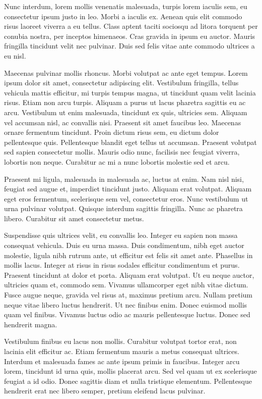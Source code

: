 Nunc interdum, lorem mollis venenatis malesuada, turpis lorem iaculis sem, eu consectetur ipsum justo in leo. Morbi a iaculis ex. Aenean quis elit commodo risus laoreet viverra a eu tellus. Class aptent taciti sociosqu ad litora torquent per conubia nostra, per inceptos himenaeos. Cras gravida in ipsum eu auctor. Mauris fringilla tincidunt velit nec pulvinar. Duis sed felis vitae ante commodo ultrices a eu nisl.

Maecenas pulvinar mollis rhoncus. Morbi volutpat ac ante eget tempus. Lorem ipsum dolor sit amet, consectetur adipiscing elit. Vestibulum fringilla, tellus vehicula mattis efficitur, mi turpis tempus magna, ut tincidunt quam velit lacinia risus. Etiam non arcu turpis. Aliquam a purus ut lacus pharetra sagittis eu ac arcu. Vestibulum ut enim malesuada, tincidunt ex quis, ultricies sem. Aliquam vel accumsan nisl, ac convallis nisi. Praesent sit amet faucibus leo. Maecenas ornare fermentum tincidunt. Proin dictum risus sem, eu dictum dolor pellentesque quis. Pellentesque blandit eget tellus ut accumsan. Praesent volutpat sed sapien consectetur mollis. Mauris odio nunc, facilisis nec feugiat viverra, lobortis non neque. Curabitur ac mi a nunc lobortis molestie sed et arcu.

Praesent mi ligula, malesuada in malesuada ac, luctus at enim. Nam nisl nisi, feugiat sed augue et, imperdiet tincidunt justo. Aliquam erat volutpat. Aliquam eget eros fermentum, scelerisque sem vel, consectetur eros. Nunc vestibulum ut urna pulvinar volutpat. Quisque interdum sagittis fringilla. Nunc ac pharetra libero. Curabitur sit amet consectetur metus.

Suspendisse quis ultrices velit, eu convallis leo. Integer eu sapien non massa consequat vehicula. Duis eu urna massa. Duis condimentum, nibh eget auctor molestie, ligula nibh rutrum ante, ut efficitur est felis sit amet ante. Phasellus in mollis lacus. Integer at risus in risus sodales efficitur condimentum et purus. Praesent tincidunt at dolor et porta. Aliquam erat volutpat. Ut eu neque auctor, ultricies quam et, commodo sem. Vivamus ullamcorper eget nibh vitae dictum. Fusce augue neque, gravida vel risus at, maximus pretium arcu. Nullam pretium neque vitae libero luctus hendrerit. Ut nec finibus enim. Donec euismod mollis quam vel finibus. Vivamus luctus odio ac mauris pellentesque luctus. Donec sed hendrerit magna.

Vestibulum finibus eu lacus non mollis. Curabitur volutpat tortor erat, non lacinia elit efficitur ac. Etiam fermentum mauris a metus consequat ultrices. Interdum et malesuada fames ac ante ipsum primis in faucibus. Integer arcu lorem, tincidunt id urna quis, mollis placerat arcu. Sed vel quam ut ex scelerisque feugiat a id odio. Donec sagittis diam et nulla tristique elementum. Pellentesque hendrerit erat nec libero semper, pretium eleifend lacus pulvinar.

